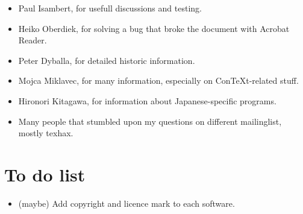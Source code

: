 \begin{itemize}
\item Paul Isambert, for usefull discussions and testing.
\item Heiko Oberdiek, for solving a bug that broke the document with Acrobat Reader.
\item Peter Dyballa, for detailed historic information.
\item Mojca Miklavec, for many information, especially on Con\TeX t-related stuff.
\item Hironori Kitagawa, for information about Japanese-specific programs.

\item Many people that stumbled upon my questions on different mailinglist, mostly texhax.
\end{itemize}

\section{To do list}
\begin{itemize}
\item (maybe) Add copyright and licence mark to each software.
\end{itemize}

